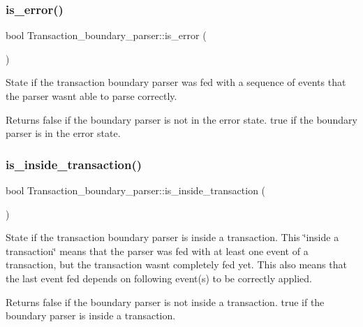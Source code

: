 \subsubsection{\texorpdfstring{is\+\_\+error()}{is\_error()}}
{\footnotesize\ttfamily bool Transaction\+\_\+boundary\+\_\+parser\+::is\+\_\+error (\begin{DoxyParamCaption}{ }\end{DoxyParamCaption})\hspace{0.3cm}{\ttfamily [inline]}}

State if the transaction boundary parser was fed with a sequence of events that the parser wasn\textquotesingle{}t able to parse correctly.

\begin{DoxyReturn}{Returns}
false if the boundary parser is not in the error state. true if the boundary parser is in the error state. 
\end{DoxyReturn}
\mbox{\label{classTransaction__boundary__parser_aa801e6b1fa7d54ebd3c586854945c7b7}} 
\subsubsection{\texorpdfstring{is\+\_\+inside\+\_\+transaction()}{is\_inside\_transaction()}}
{\footnotesize\ttfamily bool Transaction\+\_\+boundary\+\_\+parser\+::is\+\_\+inside\+\_\+transaction (\begin{DoxyParamCaption}{ }\end{DoxyParamCaption})\hspace{0.3cm}{\ttfamily [inline]}}

State if the transaction boundary parser is inside a transaction. This \char`\"{}inside a transaction\char`\"{} means that the parser was fed with at least one event of a transaction, but the transaction wasn\textquotesingle{}t completely fed yet. This also means that the last event fed depends on following event(s) to be correctly applied.

\begin{DoxyReturn}{Returns}
false if the boundary parser is not inside a transaction. true if the boundary parser is inside a transaction. 
\end{DoxyReturn}
\mbox{\label{classTransaction__boundary__parser_a59249ee780e4ba4af0d3d3fb69b6a2d2}} 
